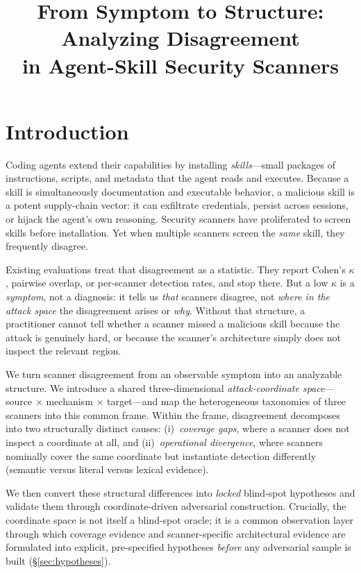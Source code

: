 \documentclass[sigconf,nonacm]{acmart}
\title{From Symptom to Structure: Analyzing Disagreement\\in Agent-Skill Security Scanners}
\begin{document}
\maketitle

\section{Introduction}
\label{sec:intro}

Coding agents extend their capabilities by installing \emph{skills}---small packages of instructions, scripts, and metadata that the agent reads and executes.
Because a skill is simultaneously documentation and executable behavior, a malicious skill is a potent supply-chain vector: it can exfiltrate credentials, persist across sessions, or hijack the agent's own reasoning.
Security scanners have proliferated to screen skills before installation.
Yet when multiple scanners screen the \emph{same} skill, they frequently disagree.

Existing evaluations treat that disagreement as a statistic.
They report Cohen's $\kappa$, pairwise overlap, or per-scanner detection rates, and stop there.
But a low $\kappa$ is a \emph{symptom}, not a diagnosis: it tells us \emph{that} scanners disagree, not \emph{where in the attack space} the disagreement arises or \emph{why}.
Without that structure, a practitioner cannot tell whether a scanner missed a malicious skill because the attack is genuinely hard, or because the scanner's architecture simply does not inspect the relevant region.

We turn scanner disagreement from an observable symptom into an analyzable structure.
We introduce a shared three-dimensional \emph{attack-coordinate space}---source $\times$ mechanism $\times$ target---and map the heterogeneous taxonomies of three scanners into this common frame.
Within the frame, disagreement decomposes into two structurally distinct causes:
(i)~\emph{coverage gaps}, where a scanner does not inspect a coordinate at all, and
(ii)~\emph{operational divergence}, where scanners nominally cover the same coordinate but instantiate detection differently (semantic versus literal versus lexical evidence).

We then convert these structural differences into \emph{locked} blind-spot hypotheses and validate them through coordinate-driven adversarial construction.
Crucially, the coordinate space is not itself a blind-spot oracle; it is a common observation layer through which coverage evidence and scanner-specific architectural evidence are formulated into explicit, pre-specified hypotheses \emph{before} any adversarial sample is built (\S\ref{sec:hypotheses}).
\end{document}
